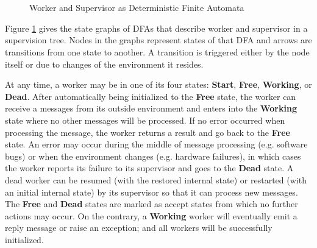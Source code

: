 \begin{figure}[p]
\begin{adjustwidth}{-2.5cm}{} 
        \\
        \\
  \caption{Worker and Supervisor as Deterministic Finite Automata}
 \end{adjustwidth}      
  \label{fig:DFA}        
\end{figure}



Figure \ref{fig:DFA} gives the state graphs of DFAs that describe 
worker and supervisor in a supervision tree.  Nodes in the graphs represent 
states of that DFA and arrows are transitions from one state to another.  A 
transition is triggered either by the node itself or due to changes of the 
environment it resides.

At any time, a worker may be in one of its four states: {\bf Start}, {\bf 
Free}, {\bf Working}, or {\bf Dead}.  After automatically being initialized to 
the {\bf Free} state, the worker can receive a messages from its outside 
environment and enters into the {\bf Working} state where no other messages 
will be processed.  If no error occurred when processing the message, the 
worker returns a result and go back to the {\bf Free} state.  An error may 
occur during the middle of message processing (e.g. software bugs) or when the 
environment changes (e.g. hardware failures), in which cases the worker reports 
its failure to its supervisor and goes to the {\bf Dead} state.  A dead worker 
can be resumed (with the restored internal state) or restarted (with an initial 
internal state) by its supervisor so that it can process new messages.  The 
{\bf Free} and {\bf Dead} states are marked as accept states from which no 
further actions may occur.  On the contrary, a {\bf Working} worker will 
eventually emit a reply message or raise an exception; and all workers will be 
successfully initialized.

